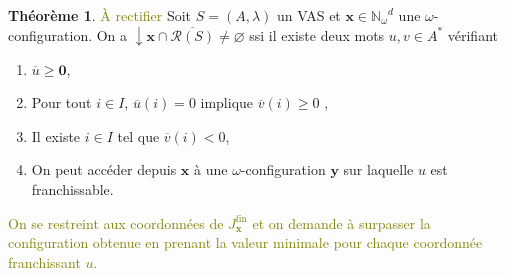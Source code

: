 \documentclass[a4paper,final]{article}
\theoremstyle{definition}
\newtheorem{Theorem}{Théorème}
\let\geq\geqslant
\newcommand{\lucas}[1]{\textcolor{olive}{#1}}
\let\inter\cap
\let\vide\varnothing
\newcommand{\Nomega}{\ensuremath{\mathbb{N}_\omega}}
\newcommand{\vect}[1]{\ensuremath{\mathbf{#1}}}
\newcommand{\valeur}[1]{\ensuremath{\overline{#1}}}
\newcommand{\inirat}{\mathcal{R}}
\newcommand{\Jfin}[1]{J^\text{fin}_{#1}}
\begin{document}
\begin{Theorem}
\lucas{À rectifier}
Soit $S = (A,\lambda)$ un VAS et $\vect{x}\in\Nomega^d$ une $\omega$-configuration.
On a $\downarrow \vect{x} \inter \overline{\inirat(S)} \neq \vide$ ssi
il existe deux mots $u,v \in A^*$ vérifiant
\begin{enumerate}
    \item $\valeur{u} \geq \vect{0}$,
    \item Pour tout $i \in I$, $\valeur{u}(i)=0$ implique $\valeur{v}(i) \geq 0$ ,
    \item Il existe $i\in I$ tel que $\valeur{v}(i) < 0$,
    \item On peut accéder depuis $\vect{x}$ à une $\omega$-configuration $\vect{y}$ sur laquelle $u$ est franchissable.
\end{enumerate}

\lucas{On se restreint aux coordonnées de $\Jfin{\vect{x}}$ et on demande à surpasser la configuration obtenue en prenant la valeur minimale pour chaque coordonnée franchissant $u$.}
\end{Theorem}

\end{document}
